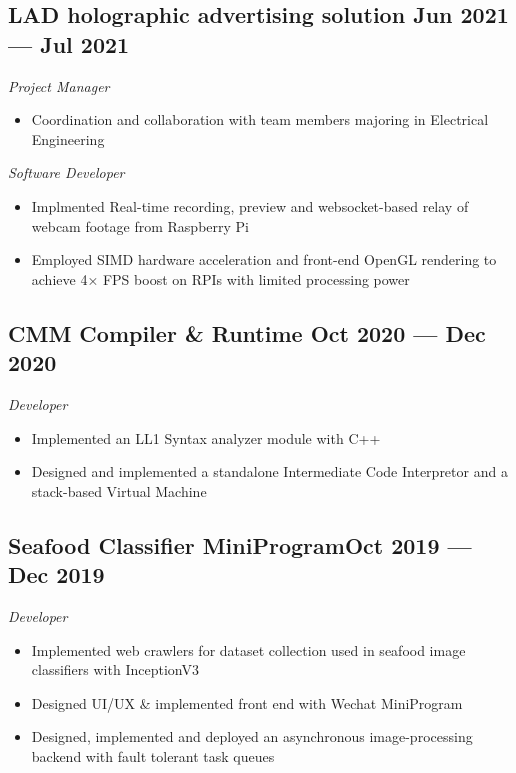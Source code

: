 \documentclass[a4,12pt]{article}
\newcommand{\subtext}[1]{
#1\par\vspace{-0.3cm}}
\newenvironment{zitemize}{
\begin{itemize}\itemsep0pt \parskip0pt \parsep1pt}
{\end{itemize}\vspace{-0.5cm}}
\begin{document}
\subsection*{LAD holographic advertising solution \hfill \textbf{Jun 2021 --- Jul 2021}}
\subtext{\textit{Project Manager}}
\begin{zitemize}
    \item Coordination and collaboration with team members majoring in Electrical Engineering
\end{zitemize}

\vspace{0.3cm}
\subtext{\textit{Software Developer}}
\begin{zitemize}
    \item Implmented Real-time recording, preview and websocket-based relay of webcam footage from Raspberry Pi
    \item Employed SIMD hardware acceleration and front-end OpenGL rendering to achieve 4× FPS boost on RPIs with limited processing power
\end{zitemize}

\subsection*{CMM Compiler \& Runtime \hfill \textbf{Oct 2020 --- Dec 2020}}
\subtext{\textit{Developer}}
\begin{zitemize}
    \item Implemented an LL1 Syntax analyzer module with C++
    \item Designed and implemented a standalone Intermediate Code Interpretor and a stack-based Virtual Machine
\end{zitemize}

\subsection*{Seafood Classifier MiniProgram\hfill \textbf{Oct 2019 --- Dec 2019}}
\subtext{\textit{Developer}}
\begin{zitemize}
    \item Implemented web crawlers for dataset collection used in seafood image classifiers with InceptionV3
    \item Designed UI/UX \& implemented front end with Wechat MiniProgram
    \item Designed, implemented and deployed an asynchronous image-processing backend with fault tolerant task queues
\end{zitemize}
\end{document}
